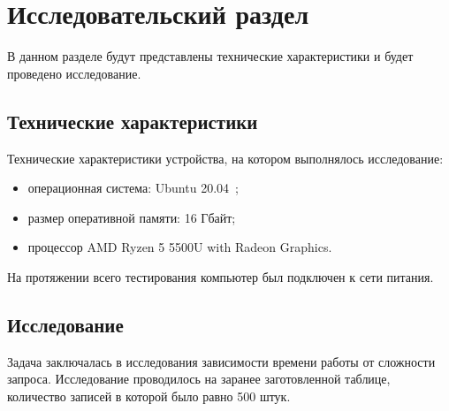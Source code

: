 \chapter{Исследовательский раздел}

В данном разделе будут представлены технические характеристики и будет проведено исследование.

\section{Технические характеристики}
Технические характеристики устройства, на котором выполнялось исследование:
\begin{itemize}
	\item операционная система: Ubuntu 20.04~\cite{ubuntu};
	\item размер оперативной памяти: 16 Гбайт;
	\item процессор AMD Ryzen 5 5500U with Radeon Graphics.

\end{itemize}
	
На протяжении всего тестирования компьютер был подключен к сети питания.
\section{Исследование}
Задача заключалась в исследования зависимости времени работы от сложности запроса.
Исследование проводилось на заранее заготовленной таблице, количество записей в которой было равно 500 штук.

